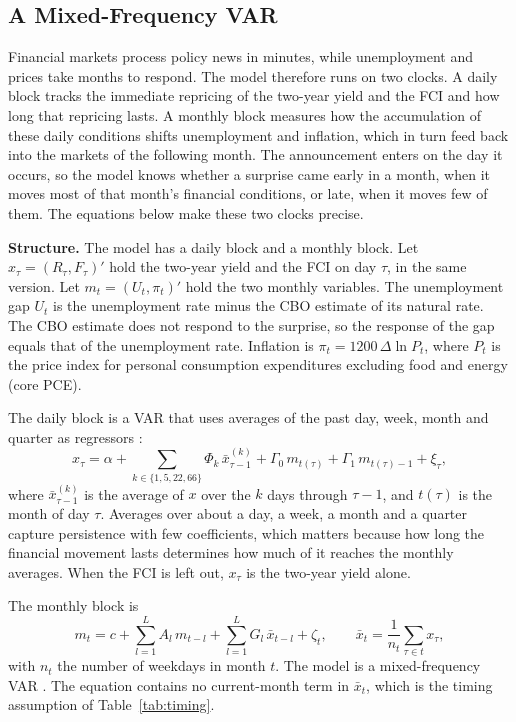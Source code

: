 \documentclass[11pt]{article}
\begin{document}
\subsection{A Mixed-Frequency VAR}\label{sec:midas}
Financial markets process policy news in minutes, while unemployment and prices take months to respond. The model therefore runs on two clocks. A daily block tracks the immediate repricing of the two-year yield and the FCI and how long that repricing lasts. A monthly block measures how the accumulation of these daily conditions shifts unemployment and inflation, which in turn feed back into the markets of the following month. The announcement enters on the day it occurs, so the model knows whether a surprise came early in a month, when it moves most of that month's financial conditions, or late, when it moves few of them. The equations below make these two clocks precise.

\textbf{Structure.} The model has a daily block and a monthly block. Let $x_\tau=(R_\tau,F_\tau)'$ hold the two-year yield and the FCI on day $\tau$, in the same version. Let $m_t=(U_t,\pi_t)'$ hold the two monthly variables. The unemployment gap $U_t$ is the unemployment rate minus the CBO estimate of its natural rate. The CBO estimate does not respond to the surprise, so the response of the gap equals that of the unemployment rate. Inflation is $\pi_t=1200\,\Delta\ln P_t$, where $P_t$ is the price index for personal consumption expenditures excluding food and energy (core PCE).

The daily block is a VAR that uses averages of the past day, week, month and quarter as regressors \citep{corsi2009}:
\begin{equation}
x_\tau = \alpha + \sum_{k\in\{1,5,22,66\}} \Phi_k\, \bar x_{\tau-1}^{(k)} + \Gamma_0\, m_{t(\tau)} + \Gamma_1\, m_{t(\tau)-1} + \xi_\tau, \label{eq:daily}
\end{equation}
where $\bar x_{\tau-1}^{(k)}$ is the average of $x$ over the $k$ days through $\tau-1$, and $t(\tau)$ is the month of day $\tau$. Averages over about a day, a week, a month and a quarter capture persistence with few coefficients, which matters because how long the financial movement lasts determines how much of it reaches the monthly averages. When the FCI is left out, $x_\tau$ is the two-year yield alone.

The monthly block is
\begin{equation}
m_t = c + \sum_{l=1}^{L} A_l\, m_{t-l} + \sum_{l=1}^{L} G_l\, \bar x_{t-l} + \zeta_t, \qquad \bar x_{t}=\frac{1}{n_t}\sum_{\tau\in t} x_\tau, \label{eq:monthly}
\end{equation}
with $n_t$ the number of weekdays in month $t$. The model is a mixed-frequency VAR \citep{ghysels2016}. The equation contains no current-month term in $\bar x_t$, which is the timing assumption of Table~\ref{tab:timing}.
\end{document}
